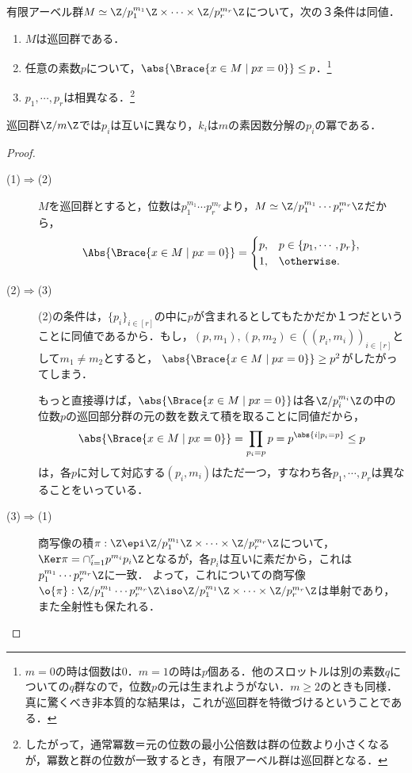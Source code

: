 \documentclass[uplatex,dvipdfmx]{jsreport}
\begin{document}
\begin{theorem}\label{thm-fundamental-theorem-of-finite-cyclic-groups}
    有限アーベル群$M\simeq \Z/p_1^{m_1}\Z\times\cdots\times\Z/p_r^{m_r}\Z$について，次の３条件は同値．
    \begin{enumerate}
        \item $M$は巡回群である．
        \item 任意の素数$p$について，$\abs{\Brace{x\in M\mid px=0}}\le p$．\footnote{$m=0$の時は個数は$0$．$m=1$の時は$p$個ある．他のスロットルは別の素数$q$についての$q$群なので，位数$p$の元は生まれようがない．$m\ge 2$のときも同様．真に驚くべき非本質的な結果は，これが巡回群を特徴づけるということである．}
        \item $p_1,\cdots,p_r$は相異なる．\footnote{したがって，通常冪数＝元の位数の最小公倍数は群の位数より小さくなるが，冪数と群の位数が一致するとき，有限アーベル群は巡回群となる．}
    \end{enumerate}
    巡回群$\Z/m\Z$では$p_i$は互いに異なり，$k_i$は$m$の素因数分解の$p_i$の冪である．
\end{theorem}
\begin{proof}\mbox{}
    \begin{description}
        \item[(1)$\Rightarrow$(2)] $M$を巡回群とすると，位数は$p_1^{m_1}\cdots p_r^{m_r}$より，$M\simeq\Z/p_1^{m_1}\cdots p_r^{m_r}\Z$だから，
        \[\Abs{\Brace{x\in M\mid px=0}}=\begin{cases}
            p,&p\in\{p_1,\cdots,p_r\},\\
            1,&\otherwise.
        \end{cases}\]
        \item[(2)$\Rightarrow$(3)]
        (2)の条件は，$\{p_i\}_{i\in[r]}$の中に$p$が含まれるとしてもたかだか１つだということに同値であるから．もし，$(p,m_1),(p,m_2)\in((p_i,m_i))_{i\in[r]}$として$m_1\ne m_2$とすると，
        $\abs{\Brace{x\in M\mid px=0}}\ge p^{2}$がしたがってしまう．

        もっと直接導けば，$\abs{\Brace{x\in M\mid px=0}}$は各$\Z/p_i^{m_i}\Z$の中の位数$p$の巡回部分群の元の数を数えて積を取ることに同値だから，
        \[\abs{\Brace{x\in M\mid px=0}}=\prod_{p_i=p}p=p^{\abs\{i\mid p_i=p\}}\le p\]
        は，各$p$に対して対応する$(p_i,m_i)$はただ一つ，すなわち各$p_1,\cdots,p_r$は異なることをいっている．
        \item[(3)$\Rightarrow$(1)]
        商写像の積$\pi:\Z\epi\Z/p_1^{m_1}\Z\times\cdots\times\Z/p_r^{m_r}\Z$について，$\Ker\pi=\cap^r_{i=1}p^{m_i}p_i\Z$となるが，各$p_i$は互いに素だから，これは$p_1^{m_1}\cdots p^{m_r}_r\Z$に一致．
        よって，これについての商写像$\o{\pi}:\Z/p_1^{m_1}\cdots p_r^{m_r}\Z\iso\Z/p_1^{m_1}\Z\times\cdots\times\Z/p_r^{m_r}\Z$は単射であり，また全射性も保たれる．
    \end{description}
\end{proof}
\end{document}
